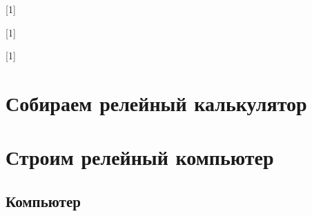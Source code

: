 \documentclass[openany]{book}
\begin{document}
\setcounter{rom}{0}
\newcommand{\incrementrom}[1]{%
\ifthenelse{\therom < #1}
{\setcounter{rom}{#1}}
{}
}
\newcommand\modulesrom[1]{\incrementrom{#1}$#1$}
\WithSuffix\newcommand\modulesrom*[1]{\incrementrom{#1}}

\setcounter{switches}{0}
\newcommand{\incrementswitches}[1]{%
\ifthenelse{\theswitches < #1}
{\setcounter{switches}{#1}}
{}
}
\newcommand\modulesswitches[1]{\incrementswitches{#1}$#1$}
\WithSuffix\newcommand\modulesswitches*[1]{\incrementswitches{#1}}

\setcounter{unary}{0}
\newcommand{\incrementunary}[1]{%
\ifthenelse{\theunary < #1}
{\setcounter{unary}{#1}}
{}
}
\newcommand\modulesunary[1]{\incrementunary{#1}$#1$}
\WithSuffix\newcommand\modulesunary*[1]{\incrementunary{#1}}


\frontmatter

\tableofcontents




\mainmatter

\part{Собираем релейный калькулятор}














\part{Строим релейный компьютер}













\chapter{Компьютер}
\end{document}
